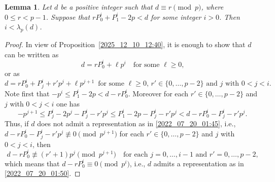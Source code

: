 \documentclass[12pt,reqno]{amsart}%
\newtheorem{lem}[prop]{Lemma}
\theoremstyle{definition}
\theoremstyle{remark}
\newcommand{\pp}{\mathfrak{p}}
\newcommand{\de}{\delta}
\newcommand{\lam}{\lambda}
\begin{document}

\begin{lem}\label{2022_07_26_22:25}
Let $d$ be a positive integer such that $d\equiv r \pmod p$, where $0 \leq r<p-1$.
Suppose that 
$ r P_0^i + P_1^i - 2p < d$
for some integer $i>0$.
Then $i<\lam_p(d)$.
\end{lem}

\begin{proof}
In view of Proposition~\ref{2025_12_10_12:40},
it is enough to show that $d$ can be written as
\begin{equation}\label{2022_07_20_01:50}
    d= r P_0^{i} + \ell p^{i} \quad \text{for some $\ell\geq 0$,}
\end{equation}
or as
\begin{equation}\label{2022_07_20_01:45}
    d = r P_0^{i} + P_j^{i} + r' p^j + \ell p^{j+1} 
    \,\,\, \text{for some $\ell \geq 0$, $r' \in \{ 0,\dots,p-2 \}$ and $j$ with $0 < j < i$.}
\end{equation}
Note first that 
$-p^i \leq P_1^i - 2p < d - r P_0^i$.
Moreover for each $r' \in \{0,\dots,p-2\}$ and $j$ with $0<j<i$ one has
\[ -p^{j+1} \leq P^i_j -2 p^j - P^i_j - r' p^j \leq P^i_1 -2 p - P^i_j - r' p^j < d - r P_0^i - P_j^i - r' p^j.  \]
Thus, if $d$ does not admit 
a representation as in \eqref{2022_07_20_01:45}, i.e.,
$ d - r P_0^i - P_j^i - r' p^j \not \equiv 0 \pmod{p^{j+1}}$ for each $r' \in \{0,\dots,p-2\}$ and $j$ with $0<j<i$,
then
\[ d - r P_0^{i} \not\equiv (r'+1) p^j \pmod{p^{j+1}} \quad \text{for each $j=0,\dots,i-1$ and $r'=0,\dots,p-2$,} \]
which means that $d - r P_0^{i} \equiv 0 \pmod{p^{i}}$, i.e., 
$d$ admits a representation as in \eqref{2022_07_20_01:50}.
\end{proof}
\end{document}
